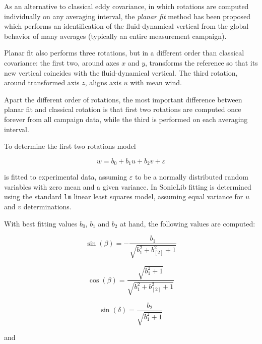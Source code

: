 \documentclass[a4paper,10pt]{book}
\begin{document}
As an alternative to classical eddy covariance, in which rotations are computed individually on any averaging interval, the \emph{planar fit} method has been proposed which performs an identification of the fluid-dynamical vertical from the global behavior of many averages (typically an entire measurement campaign).

Planar fit also performs three rotations, but in a different order than classical covariance: the first two, around axes $x$ and $y$, transforms the reference so that its new vertical coincides with the fluid-dynamical vertical. The third rotation, around transformed axis $z$, aligns axis $u$ with mean wind.

Apart the different order of rotations, the most important difference between planar fit and classical rotation is that first two rotations are computed once forever from all campaign data, while the third is performed on each averaging interval.

To determine the first two rotations model

\begin{equation}\label{eq:Planar fit plane model}
  w = b_{0} + b_{1} u + b_{2} v + \varepsilon
\end{equation} 

\noindent is fitted to experimental data, assuming $\varepsilon$ to be a normally distributed random variables with zero mean and a given variance. In SonicLib fitting is determined using the standard \verb|lm| linear least squares model, assuming equal variance for $u$ and $v$ determinations.

With best fitting values $b_{0}$, $b_{1}$ and $b_{2}$ at hand, the following values are computed:

\begin{equation}\label{eq:Planar fit angle beta sine}
  \sin(\beta) = -\frac{b_{1}}{\sqrt{b^{2}_{1} + b^{2}_[2] + 1}}
\end{equation} 

\begin{equation}\label{eq:Planar fit angle beta cosine}
  \cos(\beta) = \frac{\sqrt{b^{2}_{1}+1}}{\sqrt{b^{2}_{1} + b^{2}_[2] + 1}}
\end{equation} 

\begin{equation}\label{eq:Planar fit angle gamma sine}
  \sin(\delta) = \frac{b_{2}}{\sqrt{b^{2}_{1} + 1}}
\end{equation} 

\noindent and
\end{document}
